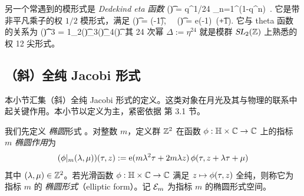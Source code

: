 
另一个常遇到的模形式是 \emph{Dedekind eta 函数}
\be\label{def:dedeta}
\eta(\t) = q^{1/24} \prod_{n=1}^\infty (1-q^n)~.
\ee
它是带非平凡乘子的权 $1/2$ 模形式，满足
\be\label{eta_multiplier}
\eta(\t) =  \eta\big(-{1\over\t}\big),~~ \eta(\t) = e\big(-{1}\big) \,\eta(\t+1). 
\ee
它与 theta 函数的关系为
\be
\eta(\t)^3 = {1}\th_2(\t)\th_3(\t)\th_4(\t).
\ee
其 24 次幂 $\Delta:=\eta^{24}$ 就是模群 $\operatorname{\textsl{SL}}_2(\mathbb{Z})$ 上熟悉的权 12 尖形式。




\subsection{（斜）全纯 Jacobi 形式}
\label{subsec:shjacobiforms}

本小节汇集（斜）全纯 Jacobi 形式的定义。这类对象在月光及其与物理的联系中起关键作用。本小节以定义为主，紧密依据 \cite{omjt} 第 3.1 节。

我们先定义 {\it 椭圆}形式 \cite{Dabholkar:2012nd}。对整数 $m$，定义群 $\mathbb{Z}^2$ 在函数 $\phi:\mathbb{H}\times\mathbb{C}\to \mathbb{C}$ 上的指标 $m$ {\em 椭圆作用}为
\begin{gather} \label{elliptic}
(\phi\lvert_{m} (\lambda,\mu) )(\tau,z) := \operatorname{e}( m\lambda^2 \tau + 2m\lambda z) \, \phi(\tau, z+\lambda \tau +\mu)
\end{gather}
其中 $(\lambda,\mu)\in \mathbb{Z}^2$。若光滑函数 $\phi:\mathbb{H}\times\mathbb{C}\to\mathbb{C}$ 满足 $z\mapsto\phi(\tau,z)$ 全纯，则称它为指标 $m$ 的 {\it 椭圆形式}（elliptic form）。记 $\mathcal{E}_m$ 为指标 $m$ 的椭圆形式空间。


